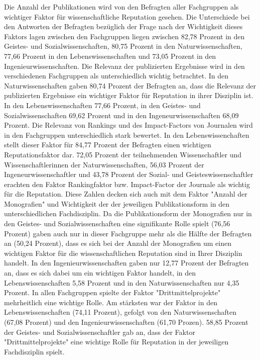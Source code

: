 Die Anzahl der Publikationen wird von den Befragten aller Fachgruppen als wichtiger Faktor für wissenschaftliche Reputation gesehen. Die Unterschiede bei den Antworten der Befragten bezüglich der Frage nach der Wichtigkeit dieses Faktors lagen zwischen den Fachgruppen liegen zwischen 82,78 Prozent in den Geistes- und Sozialwissenschaften, 80,75 Prozent in den Naturwissenschaften, 77,66 Prozent in den Lebenswissenschaften und 73,05 Prozent in den Ingenieurwissenschaften. Die Relevanz der publizierten Ergebnisse wird in den verschiedenen Fachgruppen als unterschiedlich wichtig betrachtet. In den Naturwissenschaften gaben 80,74 Prozent der Befragten an, dass die Relevanz der publizierten Ergebnisse ein wichtiger Faktor für Reputation in ihrer Disziplin ist. In den Lebenswissenschaften 77,66 Prozent, in den Geistes- und Sozialwissenschaften 69,62 Prozent und in den Ingeneurwissenschaften 68,09 Prozent. Die Relevanz von Rankings und des Impact-Factors von Journalen wird in den Fachgruppen unterschiedlich stark bewertet. In den Lebenswissenchaften stellt dieser Faktor für 84,77 Prozent der Befragten einen wichtigen Reputationsfaktor dar. 72,05 Prozent der teilnehmenden Wissenschaftler und Wissenschaftlerinnen der Naturwissenschaften, 56,03 Prozent der Ingeneurwissenschaftler und 43,78 Prozent der Sozial- und Geisteswissenschaftler erachten den Faktor Rankingfaktor bzw. Impact-Factor der Journale als wichtig für die Reputation. Diese Zahlen decken sich auch mit dem Faktor "Anzahl der Monografien" und Wichtigkeit der der jeweiligen Publikationsform in den unterschiedlichen Fachdisziplin. Da die Publikationsform der Monografien nur in den Geistes- und Sozialwissenschaften eine signifikante Rolle spielt (76,56 Prozent) gaben auch nur in dieser Fachgruppe mehr als die Hälfte der Befragten an (50,24 Prozent), dass es sich bei der Anzahl der Monografien um einen wichtigen Faktor für die wissenschaftlichen Reputation sind in Ihrer Disziplin handelt. In den Ingenieurwissenschaften gaben nur 12,77 Prozent der Befragten an, dass es sich dabei um ein wichtigen Faktor handelt, in den Lebenswissenschaften 5,58 Prozent und in den Naturwissenschaften nur 4,35 Prozent. In allen Fachgruppen spielte der Faktor "Drittmittelprojekte" mehrheitlich eine wichtige Rolle. Am stärksten war der Faktor in den Lebenswissenschaften (74,11 Prozent), gefolgt von den Naturwissenschaften (67,08 Prozent) und den Ingenieurwissenschaften (61,70 Prozen). 58,85 Prozent der Geistes- und Sozialwissenschaftler gab an, dass der Faktor "Drittmittelprojekte" eine wichtige Rolle für Reputation in der jeweiligen Fachdisziplin spielt.

